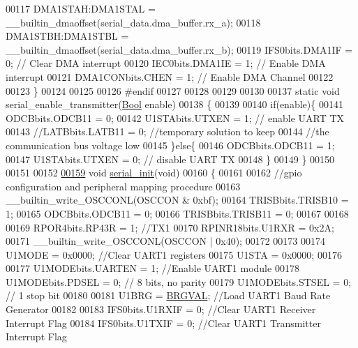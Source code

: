 \begin{DoxyCode}
00117 DMA1STAH:DMA1STAL = \_\_builtin\_dmaoffset(serial\_data.dma\_buffer.rx\_a);
00118 DMA1STBH:DMA1STBL = \_\_builtin\_dmaoffset(serial\_data.dma\_buffer.rx\_b);
00119 IFS0bits.DMA1IF = 0;                \textcolor{comment}{// Clear DMA interrupt}
00120 IEC0bits.DMA1IE = 1;                \textcolor{comment}{// Enable DMA interrupt}
00121 DMA1CONbits.CHEN = 1;               \textcolor{comment}{// Enable DMA Channel}
00122 
00123 \}
00124 
00125 
00126 \textcolor{preprocessor}{#endif}
00127 
00128 
00129 
00130 
00137 \textcolor{keyword}{static} \textcolor{keywordtype}{void} serial\_enable\_transmitter(\hyperlink{a00072_a253b248072cfc8bd812c69acd0046eed}{Bool} enable)
00138 \{
00139 
00140     \textcolor{keywordflow}{if}(enable)\{
00141     ODCBbits.ODCB11    = 0;
00142     U1STAbits.UTXEN    = 1;     \textcolor{comment}{// enable UART TX}
00143     \textcolor{comment}{//LATBbits.LATB11    = 0;   //temporary solution to keep}
00144                                 \textcolor{comment}{//the communication bus voltage low}
00145     \}\textcolor{keywordflow}{else}\{
00146     ODCBbits.ODCB11    = 1;
00147     U1STAbits.UTXEN    = 0;     \textcolor{comment}{// disable UART TX}
00148     \}
00149 \}
00150 
00151 
00152 
\hypertarget{a00030_source_l00159}{}\hyperlink{a00030_ad2b461e9e9044364a28a61cfadcacdd8}{00159} \textcolor{keywordtype}{void}     \hyperlink{a00030_ad2b461e9e9044364a28a61cfadcacdd8}{serial\_init}(\textcolor{keywordtype}{void})
00160 \{
00161 
00162     \textcolor{comment}{//gpio configuration and peripheral mapping procedure}
00163          \_\_builtin\_write\_OSCCONL(OSCCON & 0xbf);
00164              TRISBbits.TRISB10 = 1;
00165              ODCBbits.ODCB11   = 0;
00166              TRISBbits.TRISB11 = 0;
00167       
00168         
00169              RPOR4bits.RP43R   = 1; \textcolor{comment}{//TX1}
00170              RPINR18bits.U1RXR = 0x2A;
00171          \_\_builtin\_write\_OSCCONL(OSCCON | 0x40);
00172 
00173 
00174     U1MODE = 0x0000;            \textcolor{comment}{//Clear UART1 registers}
00175     U1STA  = 0x0000;
00176 
00177     U1MODEbits.UARTEN = 1;      \textcolor{comment}{//Enable UART1 module}
00178     U1MODEbits.PDSEL  = 0;      \textcolor{comment}{// 8 bits, no parity}
00179     U1MODEbits.STSEL  = 0;      \textcolor{comment}{// 1 stop bit}
00180 
00181     U1BRG = \hyperlink{a00030_aca346e181d2ffc089e22e75736a6ff63}{BRGVAL};             \textcolor{comment}{//Load UART1 Baud Rate Generator}
00182 
00183     IFS0bits.U1RXIF   = 0;      \textcolor{comment}{//Clear UART1 Receiver Interrupt Flag}
00184     IFS0bits.U1TXIF   = 0;      \textcolor{comment}{//Clear UART1 Transmitter Interrupt Flag}

\end{DoxyCode}
